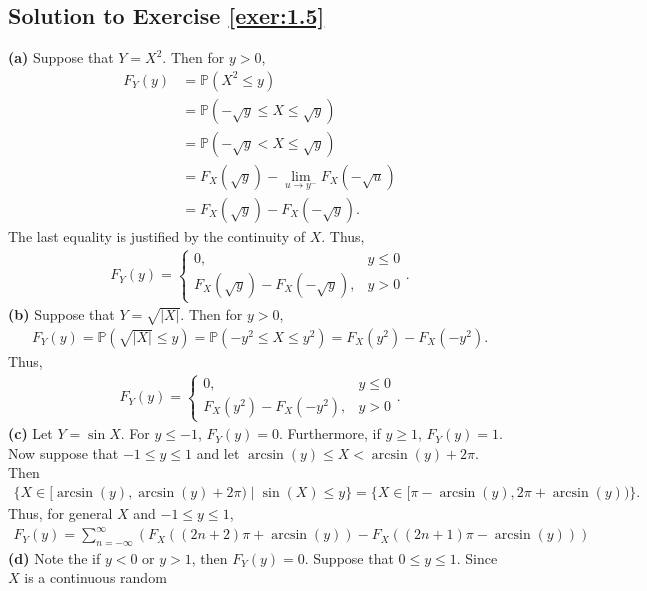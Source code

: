 \documentclass[12pt]{book}
\numberwithin{equation}{chapter}
\theoremstyle{plain}
\numberwithin{theorem}{section}
\theoremstyle{definition}
\numberwithin{exercise}{chapter}
\newcommand{\<}{\langle}
\renewcommand{\>}{\rangle}
\renewcommand{\(}{\left(}
\renewcommand{\)}{\right)}
\renewcommand{\[}{\left[}
\renewcommand{\]}{\right]}
\newcommand\Pb{\mathds{P}}
\begin{document}
\subsection*{Solution to Exercise \ref{exer:1.5}}
\textbf{(a)}
Suppose that $Y  = X^2$. Then for $y > 0$,
\begin{align}
F_Y(y)
	&= \Pb( X^2 \leq y) \\
	&= \Pb(- \sqrt y \leq X \leq \sqrt y) \\
	&= \Pb(- \sqrt y <  X \leq \sqrt y) \\
	&= F_X(\sqrt y) - \lim_{u\to y^-}F_X(- \sqrt u) \\
	&= F_X(\sqrt y) - F_X ( - \sqrt y). 
\end{align}
The last equality is justified by the continuity of $X$. Thus, 
\begin{align}
F_Y(y)
	= \left \{
	\begin{array}{lr}
	0, & y \leq 0 \\
	F_X(\sqrt y) - F_X(- \sqrt y), & y > 0
	\end{array}
	\right. .
\end{align}
\textbf{(b)}
Suppose that $Y = \sqrt{ | X |}$. Then for $y > 0$, 
\begin{align}
F_Y(y)
	= \Pb( \sqrt{ | X |} \leq y)
	= \Pb( - y^2 \leq X \leq y^2)
	= F_X(y^2) - F_X(- y^2).
\end{align}
Thus, 
\begin{align}
F_Y(y)
	= \left \{
	\begin{array}{lr}
	0, & y \leq 0 \\
	F_X(y^2) - F_X(- y^2), & y > 0
	\end{array}
	\right. .
\end{align}
\textbf{(c)}
Let $Y = \sin X$. For $y \leq -1$, $F_Y(y) = 0$. Furthermore, if $y \geq 1$, $F_Y(y) = 1$. Now suppose that $-1 \leq y 
\leq 1$ and let $\arcsin(y) \leq X < \arcsin(y) + 2\pi$. Then
\begin{align}
\{ X \in [\arcsin(y), \arcsin(y) + 2\pi) \mid \sin(X)\leq y\}
	= \{X \in [\pi - \arcsin(y), 2\pi + \arcsin(y))\}.
\end{align}
Thus, for general $X$ and $-1 \leq y \leq 1$,
\begin{align}
\label{eqn.sintrans1}
F_Y(y)
	= \sum_{n = -\infty}^\infty 
		\left( F_X ((2n +2)\pi + \arcsin(y)) - F_X((2n+1)\pi - \arcsin(y))
			\right)
\end{align}
\textbf{(d)}
Note the if $y < 0$ or $y > 1$, then $F_Y(y) = 0$. Suppose that $0 \leq y \leq 1$. Since $X$ is a continuous random 
\end{document}
